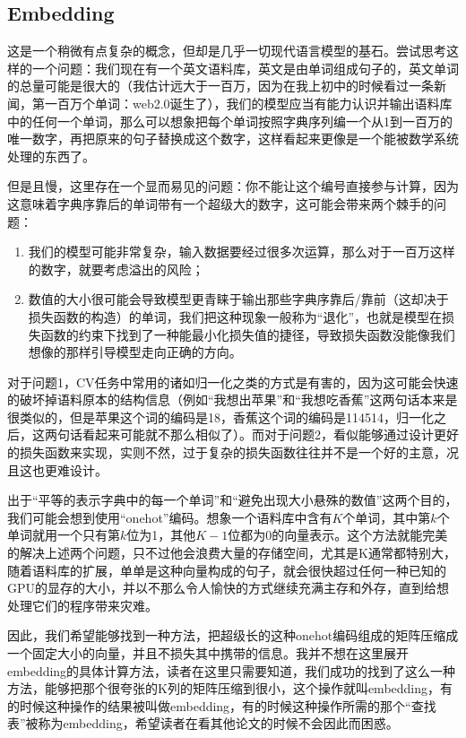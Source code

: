 \documentclass{article}
\begin{document}
\subsection{Embedding}
这是一个稍微有点复杂的概念，但却是几乎一切现代语言模型的基石。尝试思考这样的一个问题：我们现在有一个英文语料库，英文是由单词组成句子的，英文单词的总量可能是很大的（我估计远大于一百万，因为在我上初中的时候看过一条新闻，第一百万个单词：web2.0诞生了），我们的模型应当有能力认识并输出语料库中的任何一个单词，那么可以想象把每个单词按照字典序列编一个从1到一百万的唯一数字，再把原来的句子替换成这个数字，这样看起来更像是一个能被数学系统处理的东西了。

但是且慢，这里存在一个显而易见的问题：你不能让这个编号直接参与计算，因为这意味着字典序靠后的单词带有一个超级大的数字，这可能会带来两个棘手的问题：
\begin{enumerate}
    \item 我们的模型可能非常复杂，输入数据要经过很多次运算，那么对于一百万这样的数字，就要考虑溢出的风险；
    \item 数值的大小很可能会导致模型更青睐于输出那些字典序靠后/靠前（这却决于损失函数的构造）的单词，我们把这种现象一般称为“退化”，也就是模型在损失函数的约束下找到了一种能最小化损失值的捷径，导致损失函数没能像我们想像的那样引导模型走向正确的方向。
\end{enumerate}

对于问题1，CV任务中常用的诸如归一化之类的方式是有害的，因为这可能会快速的破坏掉语料原本的结构信息（例如“我想出苹果”和“我想吃香蕉”这两句话本来是很类似的，但是苹果这个词的编码是18，香蕉这个词的编码是114514，归一化之后，这两句话看起来可能就不那么相似了）。而对于问题2，看似能够通过设计更好的损失函数来实现，实则不然，过于复杂的损失函数往往并不是一个好的主意，况且这也更难设计。

出于“平等的表示字典中的每一个单词”和“避免出现大小悬殊的数值”这两个目的，我们可能会想到使用“onehot”编码。想象一个语料库中含有$K$个单词，其中第$k$个单词就用一个只有第$k$位为1，其他$K-1$位都为0的向量表示。这个方法就能完美的解决上述两个问题，只不过他会浪费大量的存储空间，尤其是K通常都特别大，随着语料库的扩展，单单是这种向量构成的句子，就会很快超过任何一种已知的GPU的显存的大小，并以不那么令人愉快的方式继续充满主存和外存，直到给想处理它们的程序带来灾难。

因此，我们希望能够找到一种方法，把超级长的这种onehot编码组成的矩阵压缩成一个固定大小的向量，并且不损失其中携带的信息。我并不想在这里展开embedding的具体计算方法，读者在这里只需要知道，我们成功的找到了这么一种方法，能够把那个很夸张的K列的矩阵压缩到很小，这个操作就叫embedding，有的时候这种操作的结果被叫做embedding，有的时候这种操作所需的那个“查找表”被称为embedding，希望读者在看其他论文的时候不会因此而困惑。
\end{document}
